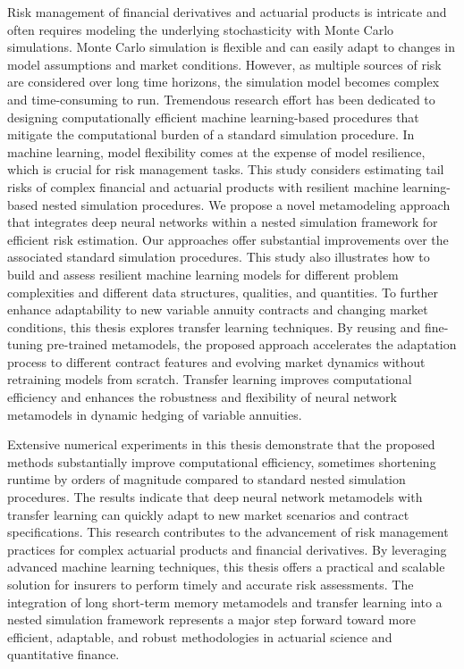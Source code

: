 Risk management of financial derivatives and actuarial products is intricate and often requires modeling the underlying stochasticity with Monte Carlo simulations.
Monte Carlo simulation is flexible and can easily adapt to changes in model assumptions and market conditions.
However, as multiple sources of risk are considered over long time horizons, the simulation model becomes complex and time-consuming to run.
Tremendous research effort has been dedicated to designing computationally efficient machine learning-based procedures that mitigate the computational burden of a standard simulation procedure.
In machine learning, model flexibility comes at the expense of model resilience, which is crucial for risk management tasks.
This study considers estimating tail risks of complex financial and actuarial products with resilient machine learning-based nested simulation procedures.
We propose a novel metamodeling approach that integrates deep neural networks within a nested simulation framework for efficient risk estimation.
Our approaches offer substantial improvements over the associated standard simulation procedures.
This study also illustrates how to build and assess resilient machine learning models for different problem complexities and different data structures, qualities, and quantities.
To further enhance adaptability to new variable annuity contracts and changing market conditions, this thesis explores transfer learning techniques.
By reusing and fine-tuning pre-trained metamodels, the proposed approach accelerates the adaptation process to different contract features and evolving market dynamics without retraining models from scratch.
Transfer learning improves computational efficiency and enhances the robustness and flexibility of neural network metamodels in dynamic hedging of variable annuities.

Extensive numerical experiments in this thesis demonstrate that the proposed methods substantially improve computational efficiency, sometimes shortening runtime by orders of magnitude compared to standard nested simulation procedures.
The results indicate that deep neural network metamodels with transfer learning can quickly adapt to new market scenarios and contract specifications.
This research contributes to the advancement of risk management practices for complex actuarial products and financial derivatives.
By leveraging advanced machine learning techniques, this thesis offers a practical and scalable solution for insurers to perform timely and accurate risk assessments.
The integration of long short-term memory metamodels and transfer learning into a nested simulation framework represents a major step forward toward more efficient, adaptable, and robust methodologies in actuarial science and quantitative finance.


